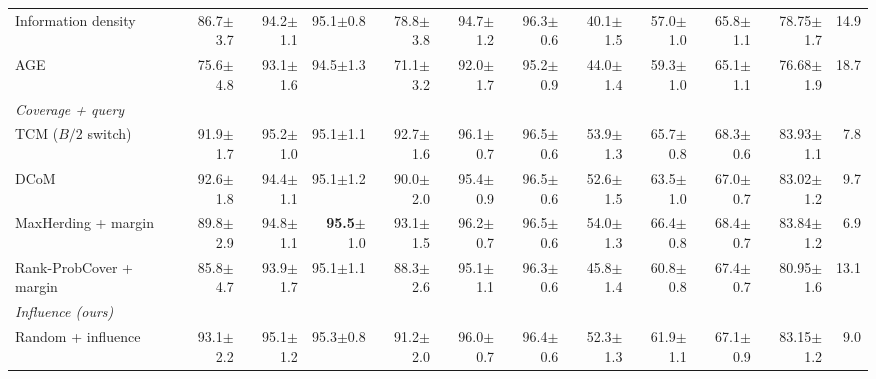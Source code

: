 \begin{table}[t]
\begin{adjustbox}{max width=\textwidth}
\begin{tabular}{lrrrrrrrrrrr}
\quad Information density~\cite{settles2008analysis} & 86.7{\scriptsize$\pm$3.7} & 94.2{\scriptsize$\pm$1.1} & 95.1{\scriptsize$\pm$0.8} & 78.8{\scriptsize$\pm$3.8} & 94.7{\scriptsize$\pm$1.2} & 96.3{\scriptsize$\pm$0.6} & 40.1{\scriptsize$\pm$1.5} & 57.0{\scriptsize$\pm$1.0} & 65.8{\scriptsize$\pm$1.1} & 78.75{\scriptsize$\pm$1.7} & 14.9 \\
\quad AGE~\cite{cai2017active} & 75.6{\scriptsize$\pm$4.8} & 93.1{\scriptsize$\pm$1.6} & 94.5{\scriptsize$\pm$1.3} & 71.1{\scriptsize$\pm$3.2} & 92.0{\scriptsize$\pm$1.7} & 95.2{\scriptsize$\pm$0.9} & 44.0{\scriptsize$\pm$1.4} & 59.3{\scriptsize$\pm$1.0} & 65.1{\scriptsize$\pm$1.1} & 76.68{\scriptsize$\pm$1.9} & 18.7 \\
\multicolumn{12}{l}{\textit{Coverage + query}} \\
\quad TCM ($B/2$ switch)~\cite{doucet2024bridging} & 91.9{\scriptsize$\pm$1.7} & 95.2{\scriptsize$\pm$1.0} & 95.1{\scriptsize$\pm$1.1} & 92.7{\scriptsize$\pm$1.6} & 96.1{\scriptsize$\pm$0.7} & 96.5{\scriptsize$\pm$0.6} & 53.9{\scriptsize$\pm$1.3} & 65.7{\scriptsize$\pm$0.8} & 68.3{\scriptsize$\pm$0.6} & 83.93{\scriptsize$\pm$1.1} & 7.8 \\
\quad DCoM~\cite{mishal2024dcom} & 92.6{\scriptsize$\pm$1.8} & 94.4{\scriptsize$\pm$1.1} & 95.1{\scriptsize$\pm$1.2} & 90.0{\scriptsize$\pm$2.0} & 95.4{\scriptsize$\pm$0.9} & 96.5{\scriptsize$\pm$0.6} & 52.6{\scriptsize$\pm$1.5} & 63.5{\scriptsize$\pm$1.0} & 67.0{\scriptsize$\pm$0.7} & 83.02{\scriptsize$\pm$1.2} & 9.7 \\
\quad MaxHerding + margin & 89.8{\scriptsize$\pm$2.9} & 94.8{\scriptsize$\pm$1.1} & \textbf{95.5}{\scriptsize$\pm$1.0} & 93.1{\scriptsize$\pm$1.5} & 96.2{\scriptsize$\pm$0.7} & 96.5{\scriptsize$\pm$0.6} & 54.0{\scriptsize$\pm$1.3} & 66.4{\scriptsize$\pm$0.8} & 68.4{\scriptsize$\pm$0.7} & 83.84{\scriptsize$\pm$1.2} & 6.9 \\
\quad Rank-ProbCover + margin & 85.8{\scriptsize$\pm$4.7} & 93.9{\scriptsize$\pm$1.7} & 95.1{\scriptsize$\pm$1.1} & 88.3{\scriptsize$\pm$2.6} & 95.1{\scriptsize$\pm$1.1} & 96.3{\scriptsize$\pm$0.6} & 45.8{\scriptsize$\pm$1.4} & 60.8{\scriptsize$\pm$0.8} & 67.4{\scriptsize$\pm$0.7} & 80.95{\scriptsize$\pm$1.6} & 13.1 \\
\multicolumn{12}{l}{\textit{Influence (ours)}} \\
\quad Random + influence & 93.1{\scriptsize$\pm$2.2} & 95.1{\scriptsize$\pm$1.2} & 95.3{\scriptsize$\pm$0.8} & 91.2{\scriptsize$\pm$2.0} & 96.0{\scriptsize$\pm$0.7} & 96.4{\scriptsize$\pm$0.6} & 52.3{\scriptsize$\pm$1.3} & 61.9{\scriptsize$\pm$1.1} & 67.1{\scriptsize$\pm$0.9} & 83.15{\scriptsize$\pm$1.2} & 9.0 \\

\end{tabular}
\end{adjustbox}
\end{table}
